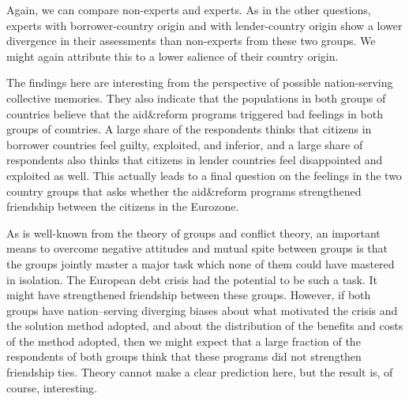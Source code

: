 Again, we can compare non-experts and experts. As in the other questions,
experts with borrower-country origin and with lender-country origin show a
lower divergence in their assessments than non-experts from these two
groups. We might again attribute this to a lower salience of their country
origin.

The findings here are interesting from the perspective of possible
nation-serving collective memories. They also indicate that the populations
in both groups of countries believe that the aid\&reform programs triggered
bad feelings in both groups of countries. A large share of the respondents
thinks that citizens in borrower countries feel guilty, exploited, and
inferior, and a large share of respondents also thinks that citizens in
lender countries feel disappointed and exploited as well. This actually
leads to a final question on the feelings in the two country groups that
asks whether the aid\&reform programs strengthened friendship between the
citizens in the Eurozone. 

As is well-known from the theory of groups and conflict theory, an important
means to overcome negative attitudes and mutual spite between groups is that
the groups jointly master a major task which none of them could have
mastered in isolation. The European debt crisis had the potential to be 
such a task. It might have strengthened friendship between these groups.
However, if both groups have nation--serving diverging biases about what
motivated the crisis and the solution method adopted, and about the
distribution of the benefits and costs of the method adopted, then we might
expect that a large fraction of the respondents of both groups think that
these programs did not strengthen friendship ties. Theory cannot make a
clear prediction here, but the result is, of course, interesting.


